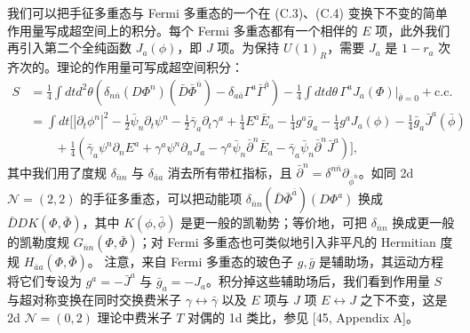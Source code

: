 我们可以把手征多重态与 Fermi 多重态的一个在 (C.3)、(C.4) 变换下不变的简单作用量写成超空间上的积分。每个 Fermi 多重态都有一个相伴的 $E$ 项，此外我们再引入第二个全纯函数 $J_a(\phi)$，即 $J$ 项。为保持 $U(1)_R$，需要 $J_a$ 是 $1-r_a$ 次齐次的。理论的作用量可写成超空间积分：
\begin{equation}\tag{C.5}
  \begin{aligned}
  S&=\frac{1}{4}\int dtd^2\theta\left(\delta_{n\bar n}(D\Phi^n)(\bar D\bar\Phi^{\bar n})-\delta_{a\bar a}\Gamma^a\bar\Gamma^{\bar a}\right)-\frac{1}{4}\int dtd\theta\,\Gamma^aJ_a(\Phi)\Big|_{\bar\theta=0}+\text{c.c.}\\
  &=\int dt\Big[|\partial_t\phi^n|^2-\frac{1}{2}\bar\psi_n\partial_t\psi^n-\frac{1}{2}\bar\gamma_a\partial_t\gamma^a+\frac{1}{4}E^a\bar E_a-\frac{1}{4}g^a\bar g_a-\frac{1}{4}g^aJ_a(\phi)-\frac{1}{4}\bar g_a\bar J^a(\bar\phi)\\
  &\qquad+\frac{1}{4}\left(\bar\gamma_a\psi^n\partial_nE^a+\gamma^a\psi^n\partial_nJ_a-\gamma^a\bar\psi_n\bar\partial^n\bar E_a-\bar\gamma_a\bar\psi_n\bar\partial^n\bar J^a\right)\Big],
  \end{aligned}
\end{equation}
其中我们用了度规 $\delta_{\bar n n}$ 与 $\delta_{\bar a a}$ 消去所有带杠指标，且 $\bar\partial^n=\delta^{n\bar n}\partial_{\bar\phi^{\bar n}}$。如同 2d $\mathcal{N}=(2,2)$ 的手征多重态，可以把动能项 $\delta_{\bar n n}(\bar D\bar\Phi^{\bar a})(D\Phi^a)$ 换成 $\bar DDK(\Phi,\bar\Phi)$，其中 $K(\phi,\bar\phi)$ 是更一般的凯勒势；等价地，可把 $\delta_{\bar n n}$ 换成更一般的凯勒度规 $G_{\bar n n}(\Phi,\bar\Phi)$；对 Fermi 多重态也可类似地引入非平凡的 Hermitian 度规 $H_{\bar a a}(\Phi,\bar\Phi)$。
注意，来自 Fermi 多重态的玻色子 $g,\bar g$ 是辅助场，其运动方程将它们专设为 $g^a=-\bar J^a$ 与 $\bar g_a=-J_a$。积分掉这些辅助场后，我们看到作用量 $S$ 与超对称变换在同时交换费米子 $\gamma\leftrightarrow\bar\gamma$ 以及 $E$ 项与 $J$ 项 $E\leftrightarrow J$ 之下不变，这是 2d $\mathcal{N}=(0,2)$ 理论中费米子 $T$ 对偶的 1d 类比，参见 [45, Appendix A]。

